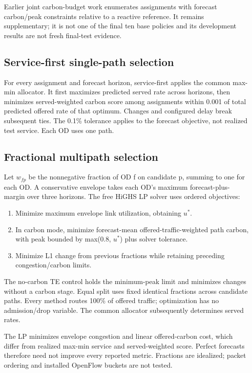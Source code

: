 \documentclass[conference,letterpaper]{IEEEtran}
\begin{document}
Earlier joint carbon-budget work enumerates assignments with forecast carbon/peak constraints relative to a reactive reference. It remains supplementary; it is not one of the final ten base policies and its development results are not fresh final-test evidence.

\subsection{Service-first single-path selection}

For every assignment and forecast horizon, service-first applies the common max-min allocator. It first maximizes predicted served rate across horizons, then minimizes served-weighted carbon score among assignments within 0.001 of total predicted offered rate of that optimum. Changes and configured delay break subsequent ties. The 0.1\% tolerance applies to the forecast objective, not realized test service. Each OD uses one path.

\subsection{Fractional multipath selection}

Let $w_{fp}$ be the nonnegative fraction of OD f on candidate p, summing to one for each OD. A conservative envelope takes each OD's maximum forecast-plus-margin over three horizons. The free HiGHS LP solver uses ordered objectives:

\begin{enumerate}
\item Minimize maximum envelope link utilization, obtaining $u^*$.

\item In carbon mode, minimize forecast-mean offered-traffic-weighted path carbon, with peak bounded by max(0.8, $u^*$) plus solver tolerance.

\item Minimize L1 change from previous fractions while retaining preceding congestion/carbon limits.

\end{enumerate}
The no-carbon TE control holds the minimum-peak limit and minimizes changes without a carbon stage. Equal split uses fixed identical fractions across candidate paths. Every method routes 100\% of offered traffic; optimization has no admission/drop variable. The common allocator subsequently determines served rates.

The LP minimizes envelope congestion and linear offered-carbon cost, which differ from realized max-min service and served-weighted score. Perfect forecasts therefore need not improve every reported metric. Fractions are idealized; packet ordering and installed OpenFlow buckets are not tested.
\end{document}
